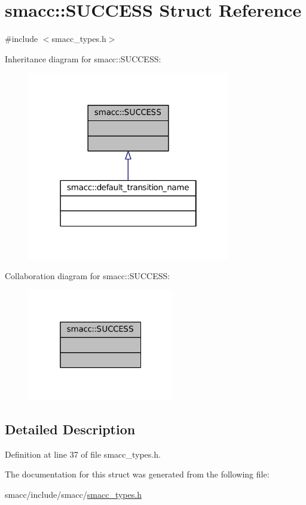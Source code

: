 \hypertarget{structsmacc_1_1SUCCESS}{}\section{smacc\+:\+:S\+U\+C\+C\+E\+SS Struct Reference}
\label{structsmacc_1_1SUCCESS}


{\ttfamily \#include $<$smacc\+\_\+types.\+h$>$}



Inheritance diagram for smacc\+:\+:S\+U\+C\+C\+E\+SS\+:
\nopagebreak
\begin{figure}[H]
\begin{center}
\leavevmode
\includegraphics[width=250pt]{structsmacc_1_1SUCCESS__inherit__graph}
\end{center}
\end{figure}


Collaboration diagram for smacc\+:\+:S\+U\+C\+C\+E\+SS\+:
\nopagebreak
\begin{figure}[H]
\begin{center}
\leavevmode
\includegraphics[width=181pt]{structsmacc_1_1SUCCESS__coll__graph}
\end{center}
\end{figure}


\subsection{Detailed Description}


Definition at line 37 of file smacc\+\_\+types.\+h.



The documentation for this struct was generated from the following file\+:\begin{DoxyCompactItemize}
\item 
smacc/include/smacc/\hyperlink{smacc__types_8h}{smacc\+\_\+types.\+h}\end{DoxyCompactItemize}
